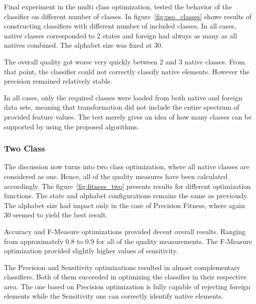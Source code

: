 \documentclass{mini}
\begin{document}
\makeFigureFitnessMulti

\makeFigureStateConfigurationMulti

\makeFigurePSOClasses

Final experiment in the multi class optimization, tested the behavior of the classifier on different number of classes. In figure~\ref{fig:pso_classes} shows results of constructing classifiers with different number of included classes. In all cases, native classes corresponded to $2$ states and foreign had always as many as all natives combined. The alphabet size was fixed at $30$.

The overall quality got worse very quickly between $2$ and $3$ native classes. From that point, the classifier could not correctly classify native elements. However the precision remained relatively stable.

In all cases, only the required classes were loaded from both native and foreign data sets, meaning that transformation did not include the entire spectrum of provided feature values. The test merely gives an idea of how many classes can be supported by using the proposed algorithms.



\subsubsection{Two Class} \label{subsec:pso_two_class}

The discussion now turns into two class optimization, where all native classes are considered as one. Hence, all of the quality measures have been calculated accordingly.
The figure~\ref{fig:fitness_two} presents results for different optimization functions. The state and alphabet configurations remains the same as previously. The alphabet size had impact only in the case of Precision Fitness, where again $30$ seemed to yield the best result.

Accuracy and F-Measure optimizations provided decent overall results. Ranging from approximately $0.8$ to $0.9$ for all of the quality measurements. The F-Measure optimization provided slightly higher values of sensitivity.

The Precision and Sensitivity optimizations resulted in almost complementary classifiers. Both of them succeeded in optimizing the classifier in their respective area. The one based on Precision optimization is fully capable of rejecting foreign elements while the Sensitivity one can correctly identify native elements.
\end{document}

